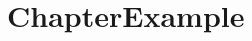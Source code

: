 \documentclass[12pt,oneside]{book}
\begin{document}


\tableofcontents
\clearpage

\chapter{ChapterExample}

\end{document}
